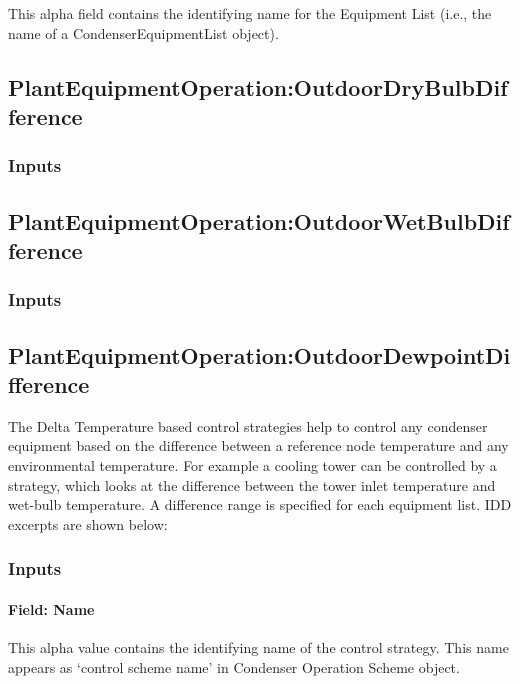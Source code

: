 This alpha field contains the identifying name for the Equipment List (i.e., the name of a CondenserEquipmentList object).

\subsection{PlantEquipmentOperation:OutdoorDryBulbDifference}\label{plantequipmentoperationoutdoordrybulbdifference}

\subsubsection{Inputs}\label{inputs-9-013}

\subsection{PlantEquipmentOperation:OutdoorWetBulbDifference}\label{plantequipmentoperationoutdoorwetbulbdifference}

\subsubsection{Inputs}\label{inputs-10-012}

\subsection{PlantEquipmentOperation:OutdoorDewpointDifference}\label{plantequipmentoperationoutdoordewpointdifference}

The Delta Temperature based control strategies help to control any condenser equipment based on the difference between a reference node temperature and any environmental temperature. For example a cooling tower can be controlled by a strategy, which looks at the difference between the tower inlet temperature and wet-bulb temperature. A difference range is specified for each equipment list. IDD excerpts are shown below:

\subsubsection{Inputs}\label{inputs-11-011}

\paragraph{Field: Name}\label{field-name-5-016}

This alpha value contains the identifying name of the control strategy. This name appears as `control scheme name' in Condenser Operation Scheme object.

